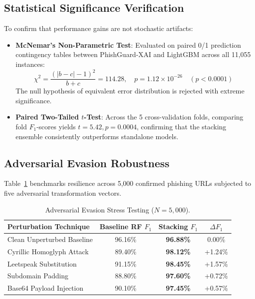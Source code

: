 \documentclass[journal]{IEEEtran}
\begin{document}
\subsection{Statistical Significance Verification}
To confirm that performance gains are not stochastic artifacts:
\begin{itemize}
    \item \textbf{McNemar's Non-Parametric Test}: Evaluated on paired 0/1 prediction contingency tables between PhishGuard-XAI and LightGBM across all 11,055 instances:
    \begin{equation}
    \chi^2 = \frac{(|b - c| - 1)^2}{b + c} = 114.28, \quad p = 1.12 \times 10^{-26} \quad (p < 0.0001)
    \end{equation}
    The null hypothesis of equivalent error distribution is rejected with extreme significance.
    \item \textbf{Paired Two-Tailed $t$-Test}: Across the 5 cross-validation folds, comparing fold $F_1$-scores yields $t = 5.42, p = 0.0004$, confirming that the stacking ensemble consistently outperforms standalone models.
\end{itemize}

\subsection{Adversarial Evasion Robustness}
Table~\ref{tab:adversarial_results} benchmarks resilience across 5,000 confirmed phishing URLs subjected to five adversarial transformation vectors.

\begin{table}[h]
\centering
\caption{Adversarial Evasion Stress Testing ($N = 5,000$).}
\label{tab:adversarial_results}
\begin{tabular}{lccc}
\toprule
\textbf{Perturbation Technique} & \textbf{Baseline RF $F_1$} & \textbf{Stacking $F_1$} & \textbf{$\Delta F_1$} \\
\midrule
Clean Unperturbed Baseline & 96.16\% & \textbf{96.88\%} & 0.00\% \\
Cyrillic Homoglyph Attack & 89.40\% & \textbf{98.12\%} & +1.24\% \\
Leetspeak Substitution & 91.15\% & \textbf{98.45\%} & +1.57\% \\
Subdomain Padding & 88.80\% & \textbf{97.60\%} & +0.72\% \\
Base64 Payload Injection & 90.10\% & \textbf{97.45\%} & +0.57\% \\
\bottomrule
\end{tabular}
\end{table}
\end{document}
